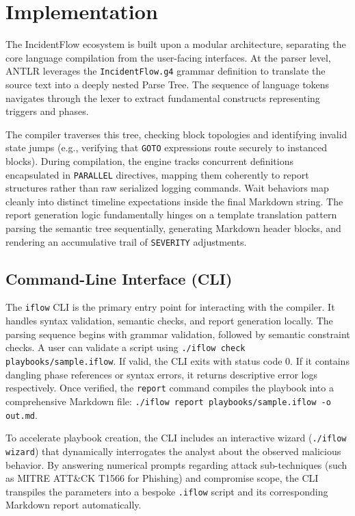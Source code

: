 \section{Implementation}
\label{sec:implementation}

The IncidentFlow ecosystem is built upon a modular architecture, separating the core language compilation from the user-facing interfaces. At the parser level, ANTLR leverages the \texttt{IncidentFlow.g4} grammar definition to translate the source text into a deeply nested Parse Tree. The sequence of language tokens navigates through the lexer to extract fundamental constructs representing triggers and phases. 

The compiler traverses this tree, checking block topologies and identifying invalid state jumps (e.g., verifying that \texttt{GOTO} expressions route securely to instanced blocks). During compilation, the engine tracks concurrent definitions encapsulated in \texttt{PARALLEL} directives, mapping them coherently to report structures rather than raw serialized logging commands. Wait behaviors map cleanly into distinct timeline expectations inside the final Markdown string. The report generation logic fundamentally hinges on a template translation pattern parsing the semantic tree sequentially, generating Markdown header blocks, and rendering an accumulative trail of \texttt{SEVERITY} adjustments.

\subsection{Command-Line Interface (CLI)}
\label{subsec:impl_cli}

The \texttt{iflow} CLI is the primary entry point for interacting with the compiler. It handles syntax validation, semantic checks, and report generation locally. The parsing sequence begins with grammar validation, followed by semantic constraint checks. A user can validate a script using \texttt{./iflow check playbooks/sample.iflow}. If valid, the CLI exits with status code 0. If it contains dangling phase references or syntax errors, it returns descriptive error logs respectively. Once verified, the \texttt{report} command compiles the playbook into a comprehensive Markdown file: \texttt{./iflow report playbooks/sample.iflow -o out.md}.

To accelerate playbook creation, the CLI includes an interactive wizard (\texttt{./iflow wizard}) that dynamically interrogates the analyst about the observed malicious behavior. By answering numerical prompts regarding attack sub-techniques (such as MITRE ATT\&CK T1566 for Phishing) and compromise scope, the CLI transpiles the parameters into a bespoke \texttt{.iflow} script and its corresponding Markdown report automatically.

